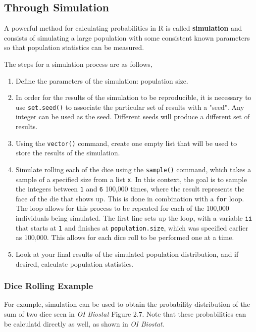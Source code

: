 \documentclass{report}\usepackage[]{graphicx}\usepackage[]{color}
\begin{document}
\subsection{Through Simulation}
A powerful method for calculating probabilities in \textsf{R} is called \textbf{simulation} and consists of simulating a large population with some consistent known parameters so that population statistics can be measured.   

The steps for a simulation process are as follows, 
\begin{enumerate}
  \item Define the parameters of the simulation: population size.
  
  \item In order for the results of the simulation to be reproducible, it is necessary to use \texttt{set.seed()} to associate the particular set of results with a "seed". Any integer can be used as the seed. Different seeds will produce a different set of results. 
  
  \item Using the \texttt{vector()} command, create one empty list that will be used to store the results of the simulation.  
  
  \item Simulate rolling each of the dice using the  \texttt{sample()} command, which takes a sample of a specified size from a list \texttt{x}. In this context, the goal is to sample the integers between \texttt{1} and \texttt{6} 100,000 times, where the result represents the face of the die that shows up.  This is done in combination with a \texttt{for} loop.  The loop allows for this process to be repeated for each of the 100,000 individuals being simulated.  The first line sets up the loop, with a variable \texttt{ii} that starts at \texttt{1} and finishes at \texttt{population.size}, which was specified earlier as 100,000. This allows for each dice roll to be performed one at a time.
  
  \item Look at your final results of the simulated population distribution, and if desired, calculate population statistics. 

\end{enumerate}

\subsubsection{Dice Rolling Example}
For example, simulation can be used to obtain the probability distribution of the sum of two dice seen in \textit{OI Biostat} Figure 2.7. Note that these probabilities can be calculatd directly as well, as shown in \textit{OI Biostat}.  
\end{document}
